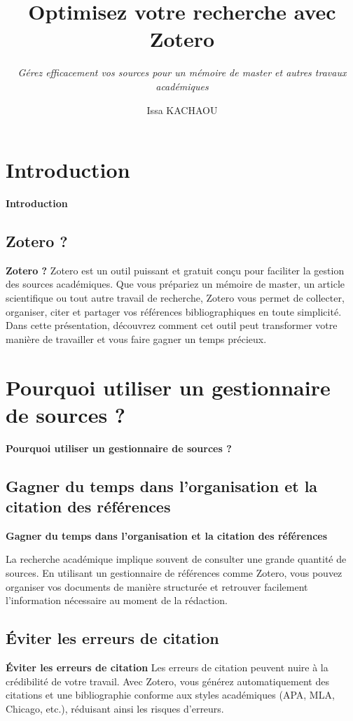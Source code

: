 \documentclass{beamer}
\title{Optimisez votre recherche avec Zotero}
\subtitle{\textit{Gérez efficacement vos sources pour un mémoire de master et autres travaux académiques}}
\author{Issa KACHAOU}
\begin{document}
\begin{frame}[plain]
    \maketitle
\end{frame}


\section{Introduction}

\begin{frame}{\textbf{Introduction}}

\subsection{Zotero ?}
\begin{block}{\textbf{Zotero ?}}
Zotero est un outil puissant et gratuit conçu pour faciliter la gestion des sources académiques. Que vous prépariez un mémoire de master, un article scientifique ou tout autre travail de recherche, Zotero vous permet de collecter, organiser, citer et partager vos références bibliographiques en toute simplicité. Dans cette présentation, découvrez comment cet outil peut transformer votre manière de travailler et vous faire gagner un temps précieux.
\end{block}	
\end{frame}

\section{Pourquoi utiliser un gestionnaire de sources ?}
\begin{frame}{\textbf{Pourquoi utiliser un gestionnaire de sources ? }}

\subsection{Gagner du temps dans l'organisation et la citation des références}
\begin{block}{\textbf{Gagner du temps dans l'organisation et la citation des références}}

La recherche académique implique souvent de consulter une grande quantité de sources. En utilisant un gestionnaire de références comme Zotero, vous pouvez organiser vos documents de manière structurée et retrouver facilement l'information nécessaire au moment de la rédaction.
\end{block}
\subsection{Éviter les erreurs de citation}
\begin{block}{\textbf{Éviter les erreurs de citation}}
Les erreurs de citation peuvent nuire à la crédibilité de votre travail. Avec Zotero, vous générez automatiquement des citations et une bibliographie conforme aux styles académiques (APA, MLA, Chicago, etc.), réduisant ainsi les risques d’erreurs.
\end{block}
\end{frame}
\end{document}
